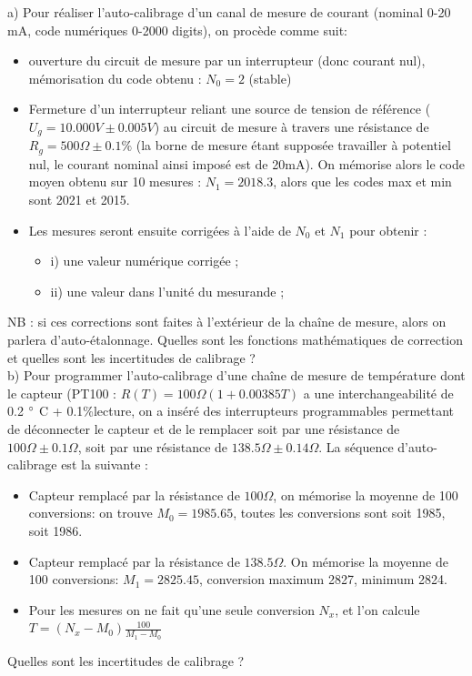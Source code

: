 a)	Pour réaliser l'auto-calibrage d'un canal de mesure de courant (nominal 0-20 mA, code numériques 0-2000 digits), on procède comme suit:
\begin{itemize}\itemsep1pt
\renewcommand{\labelitemi}{$\bullet$}
\item ouverture du circuit de mesure par un interrupteur (donc courant nul), mémorisation du code obtenu :  $N_0=2$ (stable)
\item Fermeture d'un interrupteur reliant une source de tension de référence ($U_g = 10.000V \pm 0.005V$) au circuit de mesure à travers une résistance de $R_g = 500 \Omega \pm 0.1\%$ (la borne de mesure étant supposée travailler à potentiel nul, le courant nominal ainsi imposé est de 20mA). On mémorise alors le code moyen obtenu sur 10 mesures : $N_1 = 2018.3$, alors que les codes max et min sont 2021 et 2015.
\item Les mesures seront ensuite corrigées à l'aide de $N_0$ et $N_1$ pour obtenir :
	\begin{itemize}\itemsep1pt
	\renewcommand{\labelitemi}{$\bullet$}
	\item i) une valeur numérique corrigée ;
	\item ii) une valeur dans l'unité du mesurande ;
	\end{itemize}
\end{itemize}
NB : si ces corrections sont faites à l'extérieur de la chaîne de mesure, alors on parlera d'auto-étalonnage.
Quelles sont les fonctions mathématiques de correction et quelles sont les incertitudes de calibrage ?\\

b)	Pour programmer l'auto-calibrage d'une chaîne de mesure de température dont le capteur (PT100 : $R(T)=100 \Omega (1+0.00385T)$ a une interchangeabilité de 0.2 $\degree$ C + 0.1\%lecture, on a inséré des interrupteurs programmables permettant de déconnecter le capteur et de le remplacer soit par une résistance de$ 100 \Omega \pm 0.1 \Omega$, soit par une résistance de $138.5 \Omega \pm 0.14 \Omega$. La séquence d'auto-calibrage est la suivante :
\begin{itemize}\itemsep1pt
\renewcommand{\labelitemi}{$\bullet$}
\item Capteur remplacé par la résistance de $100 \Omega$, on mémorise la moyenne de 100 conversions: on trouve $M_0=1985.65$, toutes les conversions sont soit 1985, soit 1986.
\item Capteur remplacé par la résistance de $138.5 \Omega$. On mémorise la moyenne de 100 conversions: $M_1=2825.45$, conversion maximum 2827, minimum 2824.
\item Pour les mesures on ne fait qu'une seule conversion $N_x$, et l'on calcule \\
$T= (N_x - M_0)\frac{100}{M_1 - M_0}$
\end{itemize}
Quelles sont les incertitudes de calibrage ? \\

